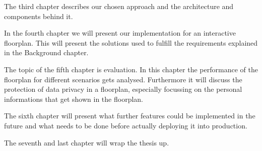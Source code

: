 The third chapter describes our chosen approach and the architecture and components behind it.

In the fourth chapter we will present our implementation for an interactive floorplan. This will present the solutions used to fulfill the requirements explained in the Background chapter.

The topic of the fifth chapter is evaluation. In this chapter the performance of the floorplan for different scenarios gets analysed. Furthermore it will discuss the protection of data privacy in a floorplan, especially focussing on the personal informations that get shown in the floorplan.

The sixth chapter will present what further features could be implemented in the future and what needs to be done before actually deploying it into production. 

The seventh and last chapter will wrap the thesis up.

\clearpage